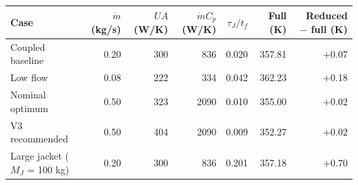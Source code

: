 \begin{tabular}{lrrrrrr}
\toprule
Case & $\dot m$ (kg/s) & $UA$ (W/K) & $\dot m C_p$ (W/K) & $\tau_J/t_f$ & Full (K) & Reduced $-$ full (K) \\
\midrule
Coupled baseline & 0.20 & 300 & 836 & 0.020 & 357.81 & +0.07 \\
Low flow & 0.08 & 222 & 334 & 0.042 & 362.23 & +0.18 \\
Nominal optimum & 0.50 & 323 & 2090 & 0.010 & 355.00 & +0.02 \\
V3 recommended & 0.50 & 404 & 2090 & 0.009 & 352.27 & +0.02 \\
Large jacket ($M_J$ = 100 kg) & 0.20 & 300 & 836 & 0.201 & 357.18 & +0.70 \\
\bottomrule
\end{tabular}
